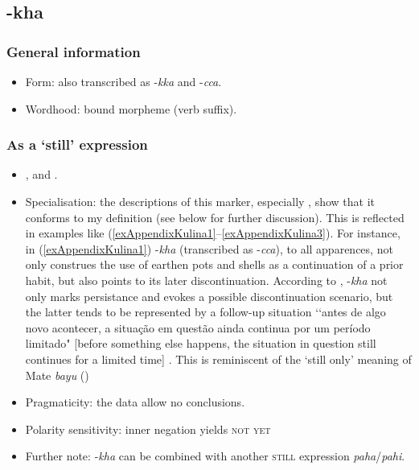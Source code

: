 \subsection{-kha}

\subsubsection{General information}
\begin{itemize}
	\item Form: also transcribed as \mbox{-\textit{kka}} and  \mbox{-\textit{cca}}.
	\item Wordhood: bound morpheme (verb suffix).
\end{itemize}

\subsubsection{As a \lq{}still\rq{ }expression}\label{appendixCulinaStill}
\begin{itemize}
	\sloppy
	\item \textcite{Boyer2020}, \textcite[126]{Dienst2014} and \textcite[183]{Tiss2004}.
	\item Specialisation: the descriptions of this marker, especially \textcite[183]{Tiss2004}, show that it conforms to my definition (see  below for further discussion). This is reflected in examples like (\ref{exAppendixKulina1}–\ref{exAppendixKulina3}). For instance, in (\ref{exAppendixKulina1}) \mbox{-\textit{kha}} (transcribed as \mbox{-\textit{cca}}), to all apparences, not only construes the use of earthen pots and shells as a continuation of a prior habit, but also points to its later discontinuation. According to \textcite{Tiss2004}, \mbox{-\textit{kha}} not only marks persistance and evokes a possible discontinuation scenario, but the latter tends to be represented by a follow-up situation \lq\lq antes de algo novo acontecer, a situação em questão ainda continua por um período limitado" [before something else happens, the situation in question still continues for a limited time] \parencite[183]{Tiss2004}. This is reminiscent of the \lq still only\rq{ }meaning of Mate \textit{bayu} ()
		
	\item Pragmaticity: the data allow no conclusions.
	\item Polarity sensitivity: inner negation yields \textsc{not yet}
	\item Further note: \mbox{-\textit{kha}} can be combined with another \textsc{still} expression \textit{paha}/\textit{pahi}.
\end{itemize}
